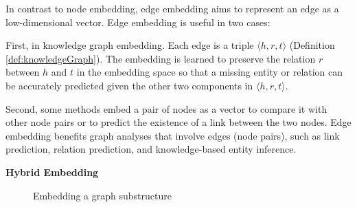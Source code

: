 In contrast to node embedding, edge embedding aims to represent an edge as a low-dimensional vector. Edge embedding is useful in two cases:

First, in knowledge graph embedding. Each edge is a triple $\langle h, r, t \rangle$ (Definition \ref{def:knowledgeGraph}). The embedding is learned to preserve the relation $r$ between $h$ and $t$ in the embedding space so that a missing entity or relation can be accurately predicted given the other two components in $\langle h, r, t \rangle$.

Second, some methods embed a pair of nodes as a vector to compare it with other node pairs or to predict the existence of a link between the two nodes. Edge embedding benefits graph analyses that involve edges (node pairs), such as link prediction, relation prediction, and knowledge-based entity inference.

\textbf{Hybrid Embedding}



\begin{figure}[htp]
	\centering
	
	
	\caption{Embedding a graph substructure}
	\label{fig:substructureEmbedding}
\end{figure}

